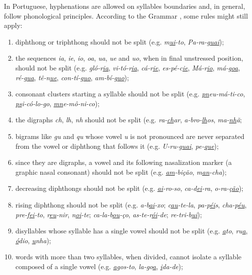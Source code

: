 \documentclass{article}
\begin{document}
In Portuguese, hyphenations are allowed on syllables boundaries and, in
general, follow phonological principles.  According to the Grammar
\parencite{cunha2016,bergstrom2011,cegalla2008}, some rules might still apply:
\begin{enumerate}
    \item\label{rule-di-triphthong} diphthong or triphthong should not be split
	(e.g. \emph{m\underline{ui}-to}, \emph{Pa-ra-g\underline{uai}});
    \item\label{rule-unstressed} the sequences \emph{ia}, \emph{ie}, \emph{io}, \emph{oa}, \emph{ua},
	\emph{ue} and \emph{uo}, when in final unstressed position, should not be split 
	(e.g. \emph{gló-r\underline{ia}}, \emph{vi-tó-r\underline{ia}}, 
	\emph{cá-r\underline{ie}}, \emph{es-pé-c\underline{ie}}, 
	\emph{Má-r\underline{io}}, \emph{má-g\underline{oa}}, 
	\emph{ré-g\underline{ua}}, \emph{tê-n\underline{ue}}, 
	\emph{con-tí-g\underline{uo}}, \emph{am-bí-g\underline{uo}});
    \item\label{rule-c-clusters} consonant clusters starting a syllable should not be
	split (e.g. \emph{\underline{pn}eu-má-ti-co}, \emph{\underline{ps}i-có-lo-go}, 
	\emph{\underline{mn}e-mô-ni-co});
    \item\label{rules-digraphs-ns} the digraphs	\emph{ch}, \emph{lh}, \emph{nh}
	should not be split (e.g. \emph{ra-\underline{ch}ar},
	\emph{a-bro-\underline{lh}os}, \emph{ma-\underline{nh}ã};
    \item\label{rule-guqu} bigrams like \emph{gu} and \emph{qu} whose vowel \emph{u} is not 
	pronounced are never separated from the vowel or diphthong that follows it 
	(e.g. \emph{U-ru-\underline{guai}}, \emph{pe-\underline{que}});
    \item\label{rule-nasalization} since they are digraphs, a vowel and its following 
	nasalization marker (a graphic nasal consonant) should not be split (e.g. \emph{\underline{am}-bição},
	\emph{m\underline{an}-cha});
    \item\label{rule-decreasing} decreasing diphthongs should not be split (e.g. 
	\emph{\underline{ai}-ro-so}, \emph{ca-d\underline{ei}-ra}, 
	\emph{o-ra-ç\underline{ão}});
    \item\label{rule-rising} rising diphthong should not be split (e.g.
	\emph{a-b\underline{ai}-xo}; \emph{c\underline{au}-te-la}, 
	\emph{pa-p\underline{éi}s}, \emph{cha-p\underline{éu}}, 
	\emph{pre-f\underline{ei}-to}, \emph{r\underline{eu}-nir},
	\emph{n\underline{oi}-te}; \emph{ca-la-b\underline{ou}-ço}, 
	\emph{as-te-r\underline{ói}-de}; 
	\emph{re-tri-b\underline{ui}});
    \item\label{rule-singlev} disyllables whose syllable has a single vowel should 
	not be split (e.g. \emph{\underline{a}to}, \emph{ru\underline{a}}, 
	\emph{\underline{ó}dio}, \emph{\underline{u}nha});
    \item\label{rule-orphan} words with more than two syllables, when divided, cannot 
	isolate a syllable composed of a single vowel (e.g. \emph{\underline{a}gos-to}, 
	\emph{la-go\underline{a}}, \emph{\underline{i}da-de});



\end{enumerate}
\end{document}
